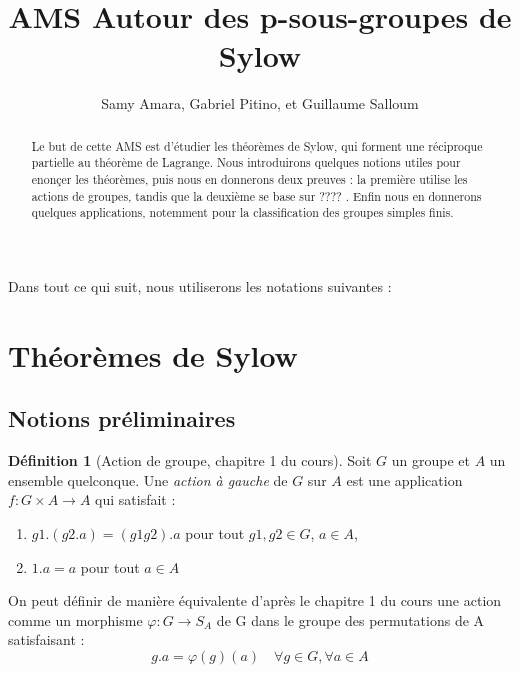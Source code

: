 \documentclass[french]{article}
\title{AMS Autour des p-sous-groupes de Sylow}
\author{Samy Amara, Gabriel Pitino, et Guillaume Salloum}
\date{}
\theoremstyle{definition}
\newtheorem{definition}[subsubsection]{Définition}
\theoremstyle{plain}
\theoremstyle{plain}
\theoremstyle{plain}
\theoremstyle{plain}
\theoremstyle{plain}
\begin{document}
\maketitle
\begin{abstract}
	Le but de cette AMS est d'étudier les théorèmes de Sylow, qui forment une réciproque partielle au théorème de Lagrange.
	Nous introduirons quelques notions utiles pour enonçer les théorèmes, puis nous en donnerons deux preuves : la première utilise les actions de groupes, tandis que la deuxième se base sur ????  .
	Enfin nous en donnerons quelques applications, notemment pour la classification des groupes simples finis.%
\end{abstract}



\tableofcontents
\clearpage

Dans tout ce qui suit, nous utiliserons les notations suivantes :
\glsaddall
\renewcommand*{\arraystretch}{1.2} %
\printnoidxglossary[title=Notations,type=symbols,style=long,sort=standard,nonumberlist]

\clearpage


\section{Théorèmes de Sylow}
\subsection{Notions préliminaires}


\begin{definition}[Action de groupe, chapitre 1 du cours]
	Soit \( G \) un groupe et \( A \) un ensemble quelconque. Une \textit{action à gauche} de \( G \) sur \( A \) est une application \( f : G \times A \rightarrow A\) qui satisfait :
	\begin{enumerate}[label = (\roman*)]
		\item \(g1.(g2.a) = (g1g2).a \) pour tout \(g1,g2 \in G\), \(a \in A\),
		\item \(1.a = a\) pour tout \(a \in A\)
	\end{enumerate}

	On peut définir de manière équivalente d'après le chapitre 1 du cours une action comme un morphisme \( \varphi : G \rightarrow S_{A} \) de G dans le groupe des permutations de A satisfaisant :
	\begin{equation}
		g.a = \varphi(g)(a) \quad \forall g \in G, \forall a \in A
	\end{equation}
\end{definition}
\end{document}
